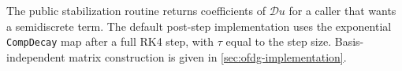 The public stabilization routine returns coefficients of $\mathcal D u$ for
a caller that wants a semidiscrete term. The default post-step implementation uses the exponential
\texttt{CompDecay} map after a full RK4 step, with $\tau$ equal to the step
size. Basis-independent matrix construction is given in
\cref{sec:ofdg-implementation}.
